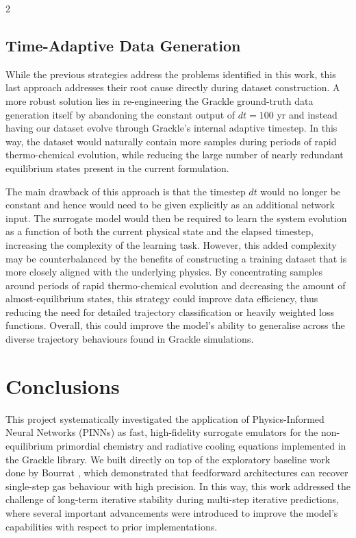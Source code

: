 \documentclass[10pt,a4paper]{article}
\begin{document}
\begin{multicols}{2}
\subsection{Time-Adaptive Data Generation}

While the previous strategies address the problems identified in this work, this last approach addresses their root cause directly during dataset construction. A more robust solution lies in re-engineering the Grackle ground-truth data generation itself by abandoning the constant output of $dt = 100$ yr and instead having our dataset evolve through Grackle's internal adaptive timestep. In this way, the dataset would naturally contain more samples during periods of rapid thermo-chemical evolution, while reducing the large number of nearly redundant equilibrium states present in the current formulation.

The main drawback of this approach is that the timestep $dt$ would no longer be constant and hence would need to be given explicitly as an additional network input. The surrogate model would then be required to learn the system evolution as a function of both the current physical state and the elapsed timestep, increasing the complexity of the learning task. However, this added complexity may be counterbalanced by the benefits of constructing a training dataset that is more closely aligned with the underlying physics. By concentrating samples around periods of rapid thermo-chemical evolution and decreasing the amount of almost-equilibrium states, this strategy could improve data efficiency, thus reducing the need for detailed trajectory classification or heavily weighted loss functions. Overall, this could improve the model's ability to generalise across the diverse trajectory behaviours found in Grackle simulations.

\section{Conclusions}

This project systematically investigated the application of Physics-Informed Neural Networks (PINNs) as fast, high-fidelity surrogate emulators for the non-equilibrium primordial chemistry and radiative cooling equations implemented in the Grackle library. We built directly on top of the exploratory baseline work done by Bourrat \cite{bourrat2026}, which demonstrated that feedforward architectures can recover single-step gas behaviour with high precision. In this way, this work addressed the challenge of long-term iterative stability during multi-step iterative predictions, where several important advancements were introduced to improve the model's capabilities with respect to prior implementations.


\end{multicols}
\end{document}
